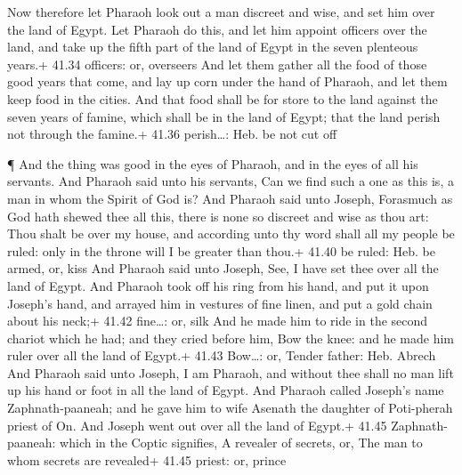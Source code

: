  Now therefore let Pharaoh look out a man discreet and
wise, and set him over the land of Egypt.  Let Pharaoh do
this, and let him appoint officers over the land, and take up the fifth
part of the land of Egypt in the seven plenteous years.+ 41.34 officers:
or, overseers  And let them gather all the food of those
good years that come, and lay up corn under the hand of Pharaoh, and let
them keep food in the cities.  And that food shall be for
store to the land against the seven years of famine, which shall be in
the land of Egypt; that the land perish not through the famine.+ 41.36
perish\ldots: Heb. be not cut off

 ¶ And the thing was good in the eyes of Pharaoh, and in
the eyes of all his servants.  And Pharaoh said unto his
servants, Can we find such a one as this is, a man in whom the Spirit of
God is?  And Pharaoh said unto Joseph, Forasmuch as God
hath shewed thee all this, there is none so discreet and wise as thou
art:  Thou shalt be over my house, and according unto thy
word shall all my people be ruled: only in the throne will I be greater
than thou.+ 41.40 be ruled: Heb. be armed, or, kiss  And
Pharaoh said unto Joseph, See, I have set thee over all the land of
Egypt.  And Pharaoh took off his ring from his hand, and
put it upon Joseph's hand, and arrayed him in vestures of fine linen,
and put a gold chain about his neck;+ 41.42 fine\ldots: or, silk
 And he made him to ride in the second chariot which he
had; and they cried before him, Bow the knee: and he made him ruler over
all the land of Egypt.+ 41.43 Bow\ldots: or, Tender father: Heb. Abrech
 And Pharaoh said unto Joseph, I am Pharaoh, and without
thee shall no man lift up his hand or foot in all the land of Egypt.
 And Pharaoh called Joseph's name Zaphnath-paaneah; and he
gave him to wife Asenath the daughter of Poti-pherah priest of On. And
Joseph went out over all the land of Egypt.+ 41.45 Zaphnath-paaneah:
which in the Coptic signifies, A revealer of secrets, or, The man to
whom secrets are revealed+ 41.45 priest: or, prince

